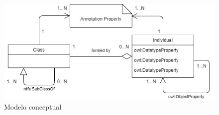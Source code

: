 \begin{figure}[H]
    \centering
    \includegraphics[scale=0.65]{Figures/Modelo_Conceptual.jpg}
    \caption{Modelo conceptual}
    \label{Diagrama_modelo_conceptual}
\end{figure}

